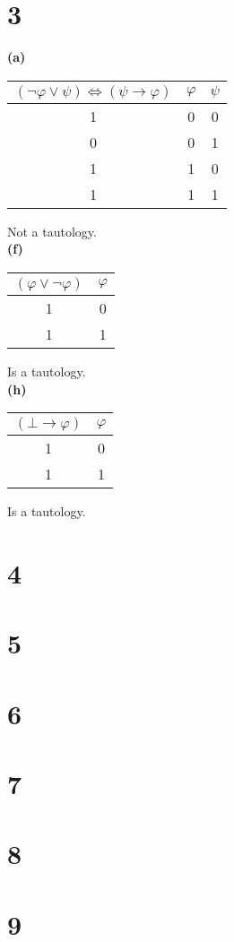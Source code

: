 \documentclass{article}
\begin{document}
\section*{3}

\textbf{(a)}

\begin{tabular}{ c || c | c }			
  $(\lnot \varphi \lor \psi) \iff (\psi \to \varphi)$ & $\varphi$ & $\psi$ \\
  \hline
  1 & 0 & 0 \\
  0 & 0 & 1 \\
  1 & 1 & 0 \\
  1 & 1 & 1 \\
  \hline  
\end{tabular}
Not a tautology.\\


\noindent \textbf{(f)}

\begin{tabular}{ c || c }			
  $(\varphi \lor \lnot \varphi)$ & $\varphi$ \\
  \hline
  1 & 0 \\
  1 & 1 \\
  \hline  
\end{tabular}
Is a tautology.\\

\noindent \textbf{(h)}

\begin{tabular}{ c || c }			
  $(\bot \to \varphi)$ & $\varphi$ \\
  \hline
  1 & 0 \\
  1 & 1 \\
  \hline  
\end{tabular}
Is a tautology.


\section*{4}




\section*{5}



\section*{6}



\section*{7}


\section*{8}


\section*{9}
\end{document}
